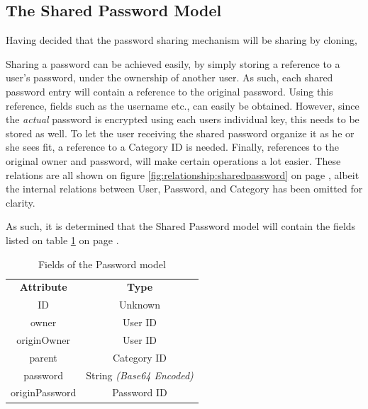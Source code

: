 		\subsection{The Shared Password Model}
			Having decided that the password sharing mechanism will be sharing by cloning, 

			Sharing a password can be achieved easily, by simply storing a reference to a user's password, under the ownership of another user. As such, each shared password entry will contain a reference to the original password. Using this reference, fields such as the username etc., can easily be obtained. However, since the \emph{actual} password is encrypted using each users individual key, this needs to be stored as well. To let the user receiving the shared password organize it as he or she sees fit, a reference to a Category ID is needed. Finally, references to the original owner and password, will make certain operations a lot easier. These relations are all shown on figure \ref{fig:relationship:sharedpassword} on page \pageref{fig:relationship:sharedpassword}, albeit the internal relations between User, Password, and Category has been omitted for clarity.

			As such, it is determined that the Shared Password model will contain the fields listed on table \ref{fig:model:sharedpassword} on page \pageref{fig:model:sharedpassword}. 

			\begin{table}[p]
				\centering
				\begin{tabular}{c|c}
					\textbf{Attribute} 		& \textbf{Type} 		\\
					ID 						& Unknown 		\\
					owner 					& User ID \\
					originOwner 			& User ID \\
					parent 					& Category ID \\
					password 				& String \emph{(Base64 Encoded)} \\
					originPassword 			& Password ID 		\\
				\end{tabular}
				\caption{Fields of the Password model}
				\label{fig:model:sharedpassword}
			\end{table}

